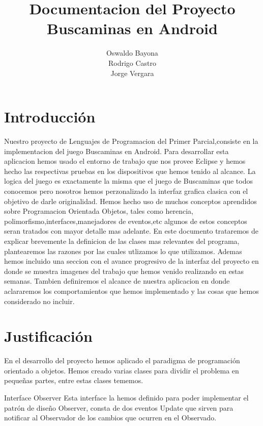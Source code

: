 \documentclass[11pt]{article} %
\title{Documentacion del Proyecto Buscaminas en Android}
\author{Oswaldo Bayona\\Rodrigo Castro\\Jorge Vergara}
\begin{document}
\maketitle

\section{Introducción}

Nuestro proyecto de Lenguajes de Programacion del Primer Parcial,consiste en la implementacion del juego Buscaminas en Android. 
Para desarrollar esta aplicacion hemos usado el entorno de trabajo que nos provee Eclipse y hemos hecho las respectivas pruebas en los dispositivos que hemos tenido al alcance. 
La logica del juego es exactamente la misma que el juego de Buscaminas que todos conocemos pero nosotros hemos perzonalizado la interfaz grafica clasica con el objetivo de darle originalidad. 
Hemos hecho uso de muchos conceptos aprendidos sobre Programacion Orientada Objetos, tales como herencia, polimorfismo,interfaces,manejadores de eventos,etc algunos de estos conceptos seran tratados con mayor detalle mas adelante.
En este documento trataremos de explicar brevemente la definicion de las clases mas relevantes del programa, plantearemos las razones por las cuales utlizamos lo que utilizamos.
Ademas hemos incluido una seccion con el avance progresivo de la interfaz del proyecto en donde se muestra imagenes del trabajo que hemos venido realizando en estas semanas.
Tambien definiremos el alcance de nuestra aplicacion en donde aclararemos los comportamientos que hemos implementado y las cosas que hemos considerado no incluir.

\section{Justificación}



En el desarrollo del proyecto hemos aplicado el paradigma de programación orientado a objetos. Hemos creado varias clases para dividir el problema en pequeñas partes, entre estas clases tememos.

Interface Observer
Esta interface la hemos definido para poder implementar el patrón de diseño Observer, consta de dos eventos Update que sirven para notificar al Observador de los cambios que ocurren en el Observado.
\end{document}

